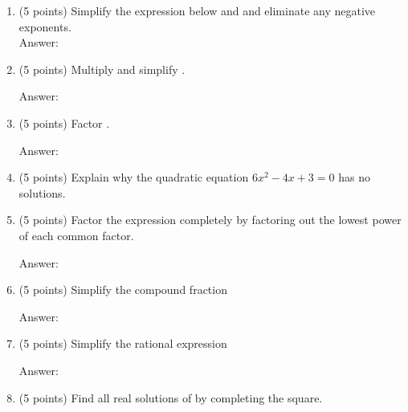 \documentclass[12pt]{article}
\begin{document}
\newpage
\begin{enumerate}

\item (5 points) Simplify the expression below and  and eliminate any negative exponents.\\

\hfill { Answer:\underline{\hspace{2in}}}\vfill
\item (5 points) Multiply and simplify .
\begin{flushright}{ Answer:\underline{\hspace{2in}}}\end{flushright}
\vfill
\item (5 points) Factor \scalebox{1.2}{$1000+8y^3$}.
\begin{flushright}{ Answer:\underline{\hspace{2in}}}\end{flushright}
\vspace{.75in}
\item (5 points) Explain why the quadratic equation $6x^2-4x+3=0$ has  no solutions.
\vspace{.75in}
\newpage
\item (5 points) Factor the expression  completely by factoring out the lowest power of each common factor.
\begin{flushright}{ Answer:\underline{\hspace{2in}}}\end{flushright}
\vfill
\item (5 points) Simplify the compound fraction 
\begin{flushright}{ Answer:\underline{\hspace{2in}}}\end{flushright}
\vfill
\item (5 points) Simplify the rational expression 
\begin{flushright}{ Answer:\underline{\hspace{2in}}}\end{flushright}
\vfill
\item (5 points) Find all real solutions of \scalebox{1.2}{$ 2x^2-3x-1=0$} by completing the square.\\


\end{enumerate}
\end{document}
